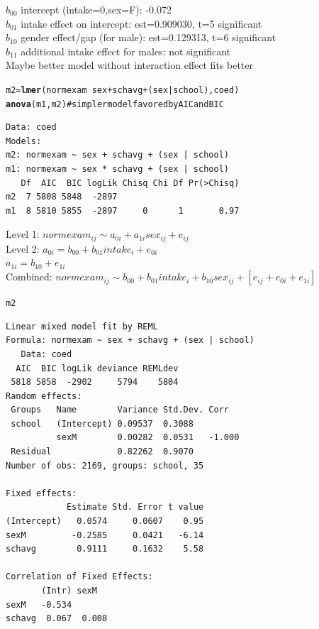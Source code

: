 \documentclass{article}\usepackage{graphicx, color}
\makeatletter
\newcommand{\hlfunctioncall}[1]{\textcolor[rgb]{0.501960784313725,0,0.329411764705882}{\textbf{#1}}}%
\newcommand{\hlcomment}[1]{\textcolor[rgb]{0.180392156862745,0.6,0.341176470588235}{#1}}%
\newenvironment{kframe}{%
 \def\at@end@of@kframe{}%
 \ifinner\ifhmode%
  \def\at@end@of@kframe{\end{minipage}}%
  \begin{minipage}{\columnwidth}%
 \fi\fi%
 \def\FrameCommand##1{\hskip\@totalleftmargin \hskip-\fboxsep
 \colorbox{shadecolor}{##1}\hskip-\fboxsep
     \hskip-\linewidth \hskip-\@totalleftmargin \hskip\columnwidth}%
 \MakeFramed {\advance\hsize-\width
   \@totalleftmargin\z@ \linewidth\hsize
   \@setminipage}}%
 {\par\unskip\endMakeFramed%
 \at@end@of@kframe}
\newenvironment{knitrout}{}{} %
\makeatother
\begin{document}
$b_{00}$ intercept (intake=0,sex=F): -0.072\\
$b_{01}$ intake effect on intercept: est=0.909030, t=5 significant\\
$b_{10}$ gender effect/gap (for male): est=0.129313, t=6 significant\\
$b_{11}$ additional intake effect for males: not significant\\

Maybe better model without interaction effect fits better
\begin{knitrout}
\color{fgcolor}\begin{kframe}
\begin{alltt}
m2=\hlfunctioncall{lmer}(normexam~sex+schavg+(sex|school), coed)
\hlfunctioncall{anova}(m1,m2) \hlcomment{# simpler model favored by AIC and BIC}
\end{alltt}
\begin{verbatim}
Data: coed
Models:
m2: normexam ~ sex + schavg + (sex | school)
m1: normexam ~ sex * schavg + (sex | school)
   Df  AIC  BIC logLik Chisq Chi Df Pr(>Chisq)
m2  7 5808 5848  -2897                        
m1  8 5810 5855  -2897     0      1       0.97
\end{verbatim}
\end{kframe}
\end{knitrout}

Level 1: $normexam_{ij} \sim a_{0i} + a_{1i} sex_{ij} + e_{ij}$\\
Level 2: $a_{0i} = b_{00} + b_{01} intake_i + e_{0i}$\\
          $a_{1i} = b_{10} + e_{1i}$\\
Combined: $normexam_{ij} \sim b_{00} + b_{01} intake_i + b_{10} sex_{ij} + [e_{ij}+e_{0i}+e_{1i}]$
\begin{knitrout}
\color{fgcolor}\begin{kframe}
\begin{alltt}
m2
\end{alltt}
\begin{verbatim}
Linear mixed model fit by REML 
Formula: normexam ~ sex + schavg + (sex | school) 
   Data: coed 
  AIC  BIC logLik deviance REMLdev
 5818 5858  -2902     5794    5804
Random effects:
 Groups   Name        Variance Std.Dev. Corr   
 school   (Intercept) 0.09537  0.3088          
          sexM        0.00282  0.0531   -1.000 
 Residual             0.82262  0.9070          
Number of obs: 2169, groups: school, 35

Fixed effects:
            Estimate Std. Error t value
(Intercept)   0.0574     0.0607    0.95
sexM         -0.2585     0.0421   -6.14
schavg        0.9111     0.1632    5.58

Correlation of Fixed Effects:
       (Intr) sexM  
sexM   -0.534       
schavg  0.067  0.008
\end{verbatim}
\end{kframe}
\end{knitrout}
\end{document}
